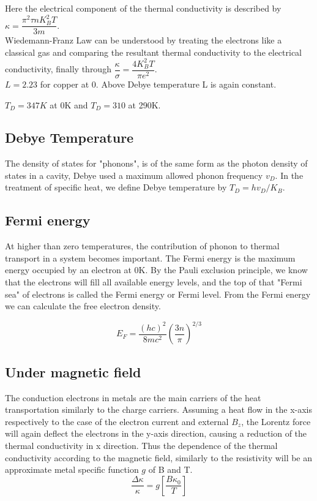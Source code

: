 \documentclass[openany,11pt,a4paper]{report}
\begin{document}
Here the electrical component of the thermal conductivity is described by $\kappa= \dfrac{\pi^{2} \tau n K_{B}^{2} T}{3m}$.\\


Wiedemann-Franz Law can be understood by treating the electrons like a classical gas and comparing the resultant thermal conductivity to the electrical conductivity, finally through $\dfrac{\kappa}{\sigma}= \dfrac{4 K_{B}^{2} T}{\pi e^{2}}$. \cite{wieman} \\
 $L = 2.23$ for copper at 0. Above Debye temperature L is again constant.



$T_{D}=347 K$  at 0K and $T_{D}=310$ at 290K.
\subsection{Debye Temperature}
The density of states for "phonons", is of the same form as the photon density of states in a cavity, Debye used a maximum allowed phonon frequency  $v_{D}$. In the treatment of specific heat, we define Debye temperature by $T_{D}=hv_{D}/K_{B}$.


\subsection{Fermi energy}
At higher than zero temperatures, the contribution of phonon to thermal transport in a system becomes important. The Fermi energy is the maximum energy occupied by an electron at 0K. By the Pauli exclusion principle, we know that the electrons will fill all available energy levels, and the top of that "Fermi sea" of electrons is called the Fermi energy or Fermi level. From the Fermi energy we can calculate the free electron density.


\begin{equation}
E_{F}= \dfrac{(hc)^{2}}{8mc^{2}} ( \dfrac{3n}{\pi})^{2/3}
\end{equation}


\subsection{Under magnetic field}
The conduction electrons in metals are the main carriers of the heat transportation similarly to the charge carriers.
Assuming a heat flow in the x-axis respectively to the case of the electron current and external $B_{z}$, the Lorentz force will again deflect the electrons in the y-axis direction, causing a reduction of the thermal conductivity in x direction. Thus the dependence of the thermal conductivity according to the magnetic field, similarly to the resistivity will be an approximate metal specific function $g$ of B and T.
\begin{equation}
\dfrac{\Delta \kappa }{\kappa }  = g \left[ \dfrac{B \kappa_{0}}{T}\right]
\end{equation}
\end{document}
